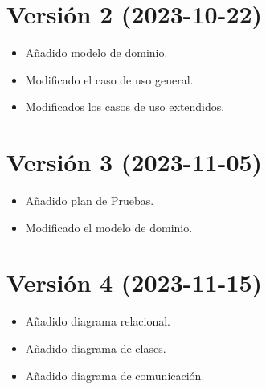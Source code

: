 ﻿\documentclass{report}
\begin{document}
        \section{Versión 2 (2023-10-22)}
            \begin{itemize}
                \item Añadido modelo de dominio.
                \item Modificado el caso de uso general.
                \item Modificados los casos de uso extendidos.
            \end{itemize}
        \section{Versión 3 (2023-11-05)}
            \begin{itemize}
                \item Añadido plan de Pruebas.
                \item Modificado el modelo de dominio.
            \end{itemize}
        \section{Versión 4 (2023-11-15)}
            \begin{itemize}
                \item Añadido diagrama relacional.
                \item Añadido diagrama de clases.
                \item Añadido diagrama de comunicación.
            \end{itemize}
\end{document}
